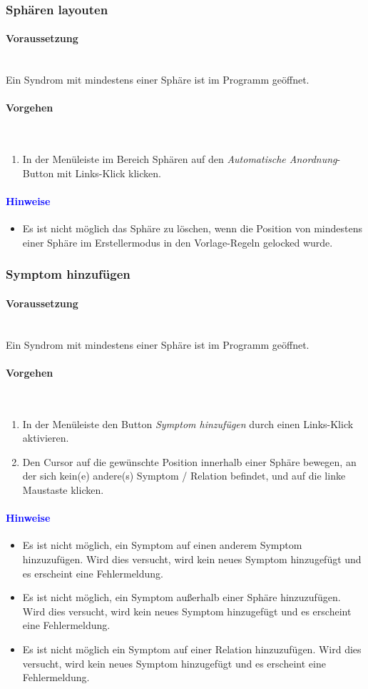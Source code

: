 \documentclass[enabledeprecatedfontcommands,fontsize=11pt,paper=a4,twoside]{scrartcl}
\newcommand*{\hint}{\paragraph{\textcolor{blue}{Hinweise}}}
\newcommand*{\condition}{\paragraph{Voraussetzung}$\;$ \vspace{0.2cm}\\}
\newcommand*{\actions}{\paragraph{Vorgehen} $\;$\vspace{0.2cm}\\}
\begin{document}
		\subsubsection{Sphären layouten}
				\condition 	
		Ein Syndrom mit mindestens einer Sphäre ist im Programm geöffnet. 
		\actions  
		\begin{enumerate}
			\item In der Menüleiste im Bereich Sphären auf den \textit{Automatische Anordnung}-Button mit Links-Klick klicken.
		\end{enumerate}
		\hint
		\begin{itemize}
			\item Es ist nicht möglich das Sphäre zu löschen, wenn die Position von mindestens einer Sphäre im Erstellermodus in den Vorlage-Regeln gelocked wurde.
			\end{itemize}
		\newpage
		\subsubsection{Symptom hinzufügen}
		\condition 	
		Ein Syndrom mit mindestens einer Sphäre ist im Programm geöffnet. 
		\actions
		\begin{enumerate}
			\item In der Menüleiste den Button \textit{Symptom hinzufügen} durch einen Links-Klick aktivieren.
			\item Den Cursor auf die gewünschte Position innerhalb einer Sphäre bewegen, an der sich kein(e) andere(s) Symptom / Relation befindet, und auf die linke Maustaste klicken.
		\end{enumerate}
		\hint
		\begin{itemize}
			\item Es ist nicht möglich, ein Symptom auf einen anderem Symptom hinzuzufügen. Wird dies versucht, wird kein neues Symptom hinzugefügt und es erscheint eine Fehlermeldung.
			\item Es ist nicht möglich, ein Symptom außerhalb einer Sphäre hinzuzufügen. Wird dies versucht, wird kein neues Symptom hinzugefügt und es erscheint eine Fehlermeldung.
			\item Es ist nicht möglich ein Symptom auf einer Relation hinzuzufügen. Wird dies versucht, wird kein neues Symptom hinzugefügt und es erscheint eine Fehlermeldung.
		\end{itemize}





		\newpage
\end{document}
